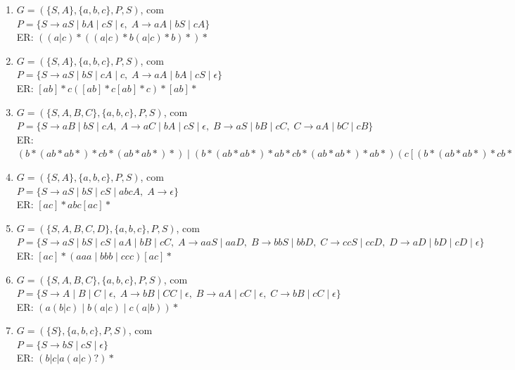 \documentclass[a4paper,12pt]{article}
\begin{document}
\begin{enumerate}
    \item[30)] 
    $G = (\{S,A\}, \{a,b,c\}, P, S)$, com \\
    $P = \{ S \to aS \mid bA \mid cS \mid \epsilon,\;
    A \to aA \mid bS \mid cA \}$ \\[6pt]
    ER: $((a|c)*((a|c)*b(a|c)*b)*)*$

    \item[31)] 
    $G = (\{S,A\}, \{a,b,c\}, P, S)$, com \\
    $P = \{ S \to aS \mid bS \mid cA \mid c,\;
    A \to aA \mid bA \mid cS \mid \epsilon \}$ \\[6pt]
    ER: $[ab]*c([ab]*c[ab]*c)*[ab]*$

    \item[32)] 
    $G = (\{S,A,B,C\}, \{a,b,c\}, P, S)$, com \\
    $P = \{ 
    S \to aB \mid bS \mid cA,\;
    A \to aC \mid bA \mid cS \mid \epsilon,\;
    B \to aS \mid bB \mid cC,\;
    C \to aA \mid bC \mid cB \}$ \\[6pt]
    ER: $(b*(ab*ab*)*cb*(ab*ab*)*) \mid (b*(ab*ab*)*ab*cb*(ab*ab*)*ab*)(c[(b*(ab*ab*)*cb*(ab*ab*)*) \mid (b*(ab*ab*)*ab*cb*(ab*ab*)*ab*)])* $

    \item[33)] 
    $G = (\{S,A\}, \{a,b,c\}, P, S)$, com \\
    $P = \{ 
    S \to aS \mid bS \mid cS \mid abcA,\;
    A \to \epsilon \}$ \\[6pt]
    ER: $[ac]*abc[ac]*$

    \item[34)] 
    $G = (\{S,A,B,C,D\}, \{a,b,c\}, P, S)$, com \\
    $P = \{ 
    S \to aS \mid bS \mid cS \mid aA \mid bB \mid cC,\;
    A \to aaS \mid aaD,\;
    B \to bbS \mid bbD,\;
    C \to ccS \mid ccD,\;
    D \to aD \mid bD \mid cD \mid \epsilon \}$ \\[6pt]
    ER: $[ac]*(aaa \mid bbb \mid ccc)[ac]*$

    \item[35)] 
    $G = (\{S,A,B,C\}, \{a,b,c\}, P, S)$, com \\
    $P = \{ 
    S \to A \mid B \mid C \mid \epsilon,\;
    A \to bB \mid CC \mid \epsilon,\;
    B \to aA \mid cC \mid \epsilon,\;
    C \to bB \mid cC \mid \epsilon \}$ \\[6pt]
    ER: $(a(b|c) \mid b(a|c) \mid c(a|b))*$

    \item[36)] 
    $G = (\{S\}, \{a,b,c\}, P, S)$, com \\
    $P = \{ S \to bS \mid cS \mid \epsilon \}$ \\[6pt]
    ER: $(b|c|a(a|c)?)*$


\end{enumerate}
\end{document}

